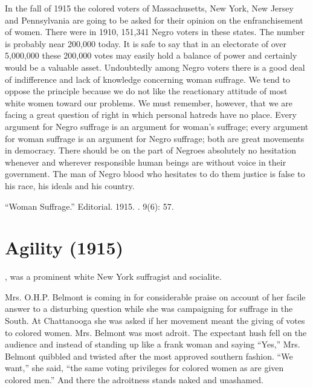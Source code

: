\documentclass[letterpaper,10pt,english]{jupyterBook}
\begin{document}
\sphinxAtStartPar
In the fall of 1915 the colored voters of Massachusetts, New York, New Jersey and Pennsylvania are going to be asked for their opinion on the enfranchisement of women. There were in 1910, 151,341 Negro voters in these states. The number is probably near 200,000 today. It is safe to say that in an electorate of over 5,000,000 these 200,000 votes may easily hold a balance of power and certainly would be a valuable asset. Undoubtedly among Negro voters there is a good deal of indifference and lack of knowledge concerning woman suffrage. We tend to oppose the principle because we do not like the reactionary attitude of most white women toward our problems. We must remember, however, that we are facing a great question of right in which personal hatreds have no place. Every argument for Negro suffrage is an argument for woman’s suffrage; every argument for woman suffrage is an argument for Negro suffrage; both are great movements in democracy. There should be on the part of Negroes absolutely no hesitation whenever and wherever responsible human beings are without voice in their government. The man of Negro blood who hesitates to do them justice is false to his race, his ideals and his country.

\sphinxAtStartPar
{} “Woman Suffrage.” Editorial. 1915. . 9(6): 57.


\section{Agility (1915)}
\label{\detokenize{Volumes/09/03/agility:agility-1915}}\label{\detokenize{Volumes/09/03/agility::doc}}
\begin{sphinxShadowBox}
\sphinxstylesidebartitle{}

\sphinxAtStartPar
{}, was a prominent white New York suffragist and socialite.
\end{sphinxShadowBox}

\sphinxAtStartPar
Mrs. O.H.P. Belmont is coming in for considerable praise on account of her facile answer to a disturbing question while she was campaigning for suffrage in the South. At Chattanooga she was asked if her movement meant the giving of votes to colored women. Mrs. Belmont was most adroit. The expectant hush fell on the audience and instead of standing up like a frank woman and saying “Yes,” Mrs. Belmont quibbled and twisted after the most approved southern fashion. “We want,” she said, “the same voting privileges for colored women as are given colored men.” And there the adroitness stands naked and unashamed.
\end{document}

